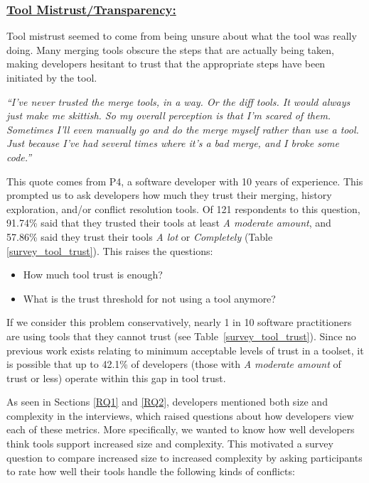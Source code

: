 \subsubsection{\underline{Tool Mistrust/Transparency:}}
Tool mistrust seemed to come from being unsure about what the tool was really doing. Many merging tools obscure the steps that are actually being taken, making developers hesitant to trust that the appropriate steps have been initiated by the tool. 
\begin{displayquote}
\textit{``I've never trusted the merge tools, in a way. Or the diff tools. It would always just make me skittish. So my overall perception is that I'm scared of them. Sometimes I'll even manually go and do the merge myself rather than use a tool. Just because I've had several times where it's a bad merge, and I broke some code.''}
\end{displayquote}
This quote comes from P4, a software developer with 10 years of experience.
This prompted us to ask developers how much they trust their merging, history exploration, and/or conflict resolution tools. Of 121 respondents to this question, 91.74\% said that they trusted their tools at least \textit{A moderate amount}, and 57.86\% said they trust their tools \textit{A lot} or \textit{Completely} (Table \ref{survey_tool_trust}). This raises the questions: 
\begin{itemize}
\item How much tool trust is enough? 
\item What is the trust threshold for not using a tool anymore?
\end{itemize}
If we consider this problem conservatively, nearly 1 in 10 software practitioners are using tools that they cannot trust (see Table~\ref{survey_tool_trust}). Since no previous work exists relating to minimum acceptable levels of trust in a toolset, it is possible that up to 42.1\% of developers (those with \textit{A moderate amount} of trust or less) operate within this gap in tool trust.

As seen in Sections \ref{RQ1} and \ref{RQ2}, developers mentioned both size and complexity in the interviews, which raised questions about how developers view each of these metrics. More specifically, we wanted to know how well developers think tools support increased size and complexity.  
This motivated a survey question to compare increased size to increased complexity by asking participants to rate how well their tools handle the following kinds of conflicts:

